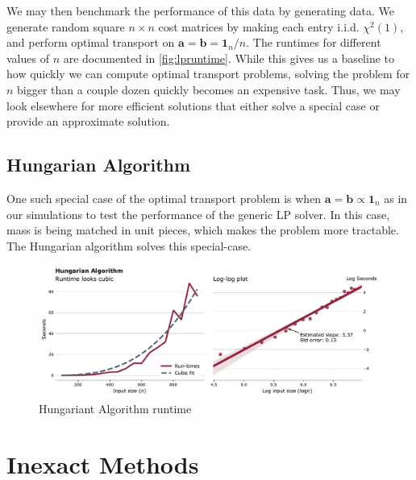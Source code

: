 \documentclass{article}
\theoremstyle{definition}
\theoremstyle{remark}
\begin{document}
We may then benchmark the performance of this data by generating data. We
generate random square $n \times n$ cost matrices by making each entry i.i.d.
$\chi^2(1)$, and perform optimal transport on $\mathbf{a} = \mathbf{b} =
\mathbf{1}_n / n$. The runtimes for different values of $n$ are documented in
\cref{fig:lpruntime}. While this gives us a baseline to how quickly we can
compute optimal transport problems, solving the problem for $n$ bigger than a
couple dozen quickly becomes an expensive task. Thus, we may look elsewhere for
more efficient solutions that either solve a special case or provide an
approximate solution.


\subsection{Hungarian Algorithm} %
\label{sub:hungarian_algorithm}

One such special case of the optimal transport problem is when $\mathbf{a} =
\mathbf{b} \propto \mathbf{1}_n$ as in our simulations to test the performance
of the generic LP solver. In this case, mass is being matched in unit pieces,
which makes the problem more tractable. The Hungarian algorithm solves this
special-case.


\begin{figure}[h]
\includegraphics[width=\textwidth]{../../code/hungarianruntime.pdf}
\caption{Hungariant Algorithm runtime}
\label{fig:hungarianruntime}
\end{figure}


\section{Inexact Methods} %
\label{sec:inexact_methods}
\end{document}

